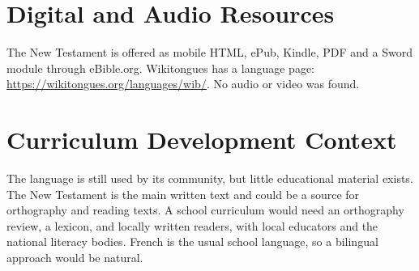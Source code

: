 \documentclass[12pt]{article}
\begin{document}
\section{Digital and Audio Resources}
The New Testament is offered as mobile HTML, ePub, Kindle, PDF and a Sword module through eBible.org. Wikitongues has a language page: \url{https://wikitongues.org/languages/wib/}. No audio or video was found.

\section{Curriculum Development Context}
The language is still used by its community, but little educational material exists. The New Testament is the main written text and could be a source for orthography and reading texts. A school curriculum would need an orthography review, a lexicon, and locally written readers, with local educators and the national literacy bodies. French is the usual school language, so a bilingual approach would be natural.
\end{document}
